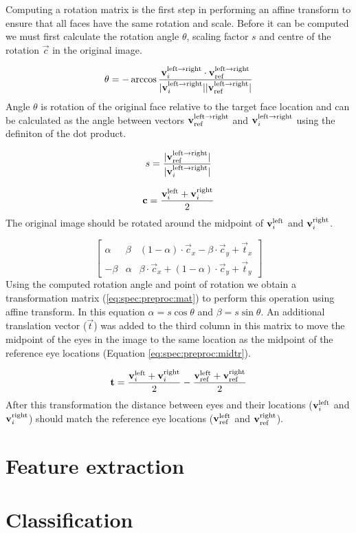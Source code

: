 Computing a rotation matrix is the first step in performing an affine transform
to ensure that all faces have the same rotation and scale. Before it can be 
computed we must first calculate the rotation angle $\theta$, scaling factor
$s$ and centre of the rotation $\vec{c}$ in the original image.

\begin{equation}
    \label{eq:spec:preproc:angle}
    \theta = -\arccos{\frac{\mathbf{v}_i^{\text{left} \rightarrow \text{right}}\cdot \mathbf{v}_{\text{ref}}^{\text{left} \rightarrow \text{right}}}{|\mathbf{v}_i^{\text{left} \rightarrow \text{right}}| |\mathbf{v}_{\text{ref}}^{\text{left} \rightarrow \text{right}}|}}
\end{equation}
Angle $\theta$ is rotation of the original face relative to the target face
location and can be calculated as the angle between vectors $\mathbf{v}_{\text{ref}}^{\text{left} \rightarrow \text{right}}$ and
$\mathbf{v}_i^{\text{left} \rightarrow \text{right}}$ using the definiton of the dot product.

\begin{equation}
    \label{eq:spec:preproc:scales}
    s = \frac{|\mathbf{v}_{\text{ref}}^{\text{left} \rightarrow \text{right}}|}{|\mathbf{v}_i^{\text{left} \rightarrow \text{right}}|}
\end{equation}

\begin{equation}
    \label{eq:spec:preproc:centre}
    \mathbf{c} = \frac{\mathbf{v}_i^{\text{left}} + \mathbf{v}_i^{\text{right}}}{2}
\end{equation}
The original image should be rotated around the midpoint of $\mathbf{v}_i^{\text{left}}$ and
$\mathbf{v}_i^{\text{right}}$.

\begin{equation}
    \label{eq:spec:preproc:mat}
    \begin{bmatrix}
    \alpha & \beta  & (1-\alpha)\cdot \vec{c}_x - \beta \cdot \vec{c}_y + \vec{t}_x \\
    -\beta & \alpha & \beta \cdot \vec{c}_x + (1-\alpha)\cdot \vec{c}_y + \vec{t}_y
    \end{bmatrix}
\end{equation}
Using the computed rotation angle and point of rotation we obtain a
transformation matrix (\ref{eq:spec:preproc:mat}) to perform this operation
using affine transform. In this equation $\alpha = s\cos\theta$ and $\beta =
s\sin\theta$. An additional translation vector ($\vec{t}$) was added to the
third column in this matrix to move the midpoint of the eyes in the image to
the same location as the midpoint of the reference eye locations (Equation
\ref{eq:spec:preproc:midtr}). 

\begin{equation}
    \label{eq:spec:preproc:midtr}
    \mathbf{t} = \frac{\mathbf{v}_i^{\text{left}} + \mathbf{v}_i^{\text{right}}}{2} - \frac{\mathbf{v}_{\text{ref}}^{\text{left}} + \mathbf{v}_{\text{ref}}^{\text{right}}}{2}
\end{equation}
After this transformation the distance between eyes and their locations
($\mathbf{v}_i^{\text{left}}$ and $\mathbf{v}_i^{\text{right}}$) should match the reference eye locations
($\mathbf{v}_{\text{ref}}^{\text{left}}$ and $\mathbf{v}_{\text{ref}}^{\text{right}}$).

\section{Feature extraction}


\section{Classification}

